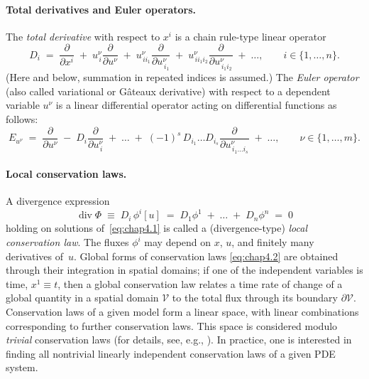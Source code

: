 \documentclass[alpha-refs, 12pt]{wiley-article}
\newcommand{\pd}[2]{\frac{\partial #1}{\partial #2}}
\begin{document}
\paragraph{Total derivatives and Euler operators.} The \emph{total derivative} with respect to $x^{i}$ is a chain rule-type linear operator
\[
  D_{i}\;=\;
  \pd{}{x^{i}}
  \;+\;
  u^{\nu}_{\,i}\pd{}{u^{\nu}}
  \;+\;
  u^{\nu}_{\,ii_{1}}\pd{}{u^{\nu}_{\,i_{1}}}
  \;+\;
  u^{\nu}_{\,ii_{1}i_{2}}\pd{}{u^{\nu}_{\,i_{1}i_{2}}}
  \;+\;\dots,
  \qquad i \in \{1,\dots,n\}.
\]
(Here and below, summation in repeated indices is assumed.) The \emph{Euler operator} (also called variational or Gâteaux derivative) with respect to a dependent variable $u^\nu$ is a linear differential operator acting on differential functions as follows:
\begin{equation}\label{eq:chap4.4}
  E_{u^\nu}\;=\;
  \pd{}{u^\nu}
  \;-\;
  D_{i}\pd{}{u^\nu_{\,i}}
  \;+\;
  \dots
  \;+\;
  (-1)^{s}\,D_{i_{1}}\dots D_{i_{s}}
  \pd{}{u^\nu_{\,i_{1}\dots i_{s}}}
  \;+\;\dots ,
  \qquad \nu \in \{1,\dots,m\}.
\end{equation}


\paragraph{Local conservation laws.} A divergence expression
\begin{equation}\label{eq:chap4.2}
  \operatorname{div}\Phi
  \;\equiv\;
  D_{i}\,\phi^{i}[u]
  \;=\;
  D_{1}\phi^{1}
  \;+\;\dots\;+\;
  D_{n}\phi^{n}
  \;=\;0
\end{equation}
holding on solutions of~\eqref{eq:chap4.1} is called a (divergence-type) \emph{local conservation law}. The fluxes $\phi^{i}$ may depend on $x$, $u$, and finitely many derivatives of~$u$. Global forms of conservation laws \eqref{eq:chap4.2} are obtained through their integration in spatial domains; if one of the independent variables is time, $x^1\equiv t$, then a global conservation law relates a time rate of change of a global quantity in a spatial domain $\mathcal{V}$ to the total flux through its boundary $\partial\mathcal{V}$. Conservation laws of a given model form a linear space, with linear combinations corresponding to further conservation laws. This space is considered modulo \emph{trivial} conservation laws (for details, see, e.g., \citet{anco2020different}). In practice, one is interested in finding all nontrivial linearly independent conservation laws of a given PDE system.
\end{document}
